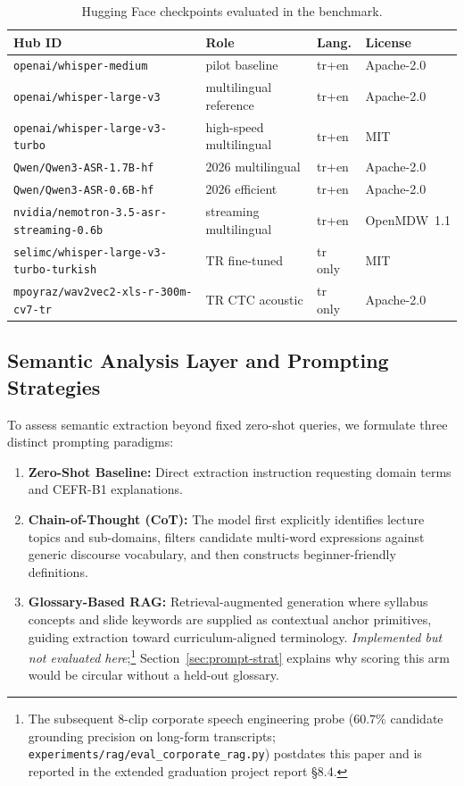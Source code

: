 \documentclass[conference]{IEEEtran}
\begin{document}
\begin{table}[t]
\caption{Hugging Face checkpoints evaluated in the benchmark.}
\label{tab:hf2026}
\centering
\renewcommand{\arraystretch}{1.12}
\setlength{\tabcolsep}{3pt}
\begin{tabular}{@{}p{3.55cm} l l l@{}}
\toprule
\textbf{Hub ID} & \textbf{Role} & \textbf{Lang.} & \textbf{License} \\
\midrule
\texttt{openai/whisper-medium} & pilot baseline & tr+en & Apache-2.0 \\
\texttt{openai/whisper-large-v3} & multilingual reference & tr+en & Apache-2.0 \\
\texttt{openai/whisper-large-v3-turbo} & high-speed multilingual & tr+en & MIT \\
\texttt{Qwen/Qwen3-ASR-1.7B-hf} & 2026 multilingual & tr+en & Apache-2.0 \\
\texttt{Qwen/Qwen3-ASR-0.6B-hf} & 2026 efficient & tr+en & Apache-2.0 \\
\texttt{nvidia/nemotron-3.5-asr-streaming-0.6b} & streaming multilingual & tr+en & OpenMDW~1.1 \\
\texttt{selimc/whisper-large-v3-turbo-turkish} & TR fine-tuned & tr only & MIT \\
\texttt{mpoyraz/wav2vec2-xls-r-300m-cv7-tr} & TR CTC acoustic & tr only & Apache-2.0 \\
\bottomrule
\end{tabular}
\end{table}

\subsection{Semantic Analysis Layer and Prompting Strategies}
\label{sec:prompting}

To assess semantic extraction beyond fixed zero-shot queries, we formulate three distinct prompting paradigms:
\begin{enumerate}
\item \textbf{Zero-Shot Baseline:} Direct extraction instruction requesting domain terms and CEFR-B1 explanations.
\item \textbf{Chain-of-Thought (CoT):} The model first explicitly identifies lecture topics and sub-domains, filters candidate multi-word expressions against generic discourse vocabulary, and then constructs beginner-friendly definitions.
\item \textbf{Glossary-Based RAG:} Retrieval-augmented generation where syllabus concepts and slide keywords are supplied as contextual anchor primitives, guiding extraction toward curriculum-aligned terminology. \emph{Implemented but not evaluated here};\footnote{The subsequent 8-clip corporate speech engineering probe ($60.7\%$ candidate grounding precision on long-form transcripts; \texttt{experiments/rag/eval\_corporate\_rag.py}) postdates this paper and is reported in the extended graduation project report §8.4.} Section~\ref{sec:prompt-strat} explains why scoring this arm would be circular without a held-out glossary.
\end{enumerate}
\end{document}
